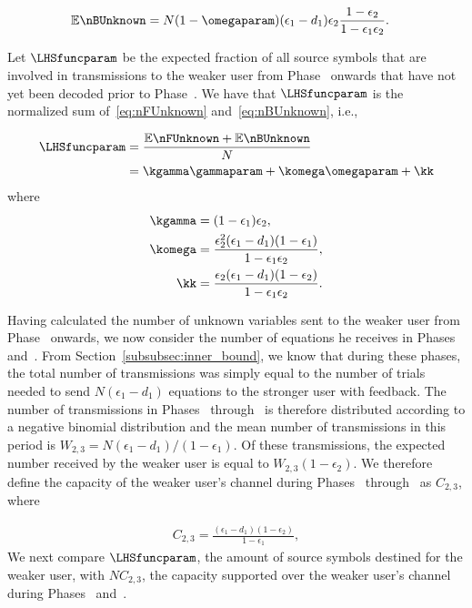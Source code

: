 \setcounter{cnt}{1}
\begin{align}
	\label{eq:nBUnknown}
	\mathbb{E}\nBUnknown &= N(1  - \omegaparam)(\epsilon_1 - d_1)\epsilon_2 \frac{1 - \epsilon_2}{1 - \epsilon_1\epsilon_2}.
\end{align}

Let $\LHSfuncparam$ be the expected fraction of all source symbols that are involved in transmissions to the weaker user from Phase~ onwards that have not yet been decoded prior to Phase~.  We have that $\LHSfuncparam$ is the normalized sum of~\eqref{eq:nFUnknown} and~\eqref{eq:nBUnknown}, i.e., 

\begin{align}
	\LHSfuncparam &= \frac{\mathbb{E}\nFUnknown + \mathbb{E}\nBUnknown}{N} \\
	&= \kgamma \gammaparam + \komega \omegaparam	+ \kk
	\label{eq:LHSfuncparam}
\end{align}
where 
\begin{subequations}
\begin{align}
	\kgamma &= (1 - \epsilon_1)\epsilon_2, \label{eq:kgamma} \\	
	\komega &= \frac{\epsilon_{2}^{2}(\epsilon_1 - d_1)(1 - \epsilon_1)}{1 - \epsilon_1\epsilon_2}, 	\label{eq:komega}\\
	\kk &= \frac{\epsilon_{2}(\epsilon_1 - d_1)(1 - \epsilon_2)}{1 - \epsilon_1\epsilon_2}.
	\label{eq:kk}
\end{align}
\end{subequations}

Having calculated the number of unknown variables sent to the weaker user from Phase~ onwards, we now consider the number of equations he receives in Phases~ and~.  From Section~\ref{subsubsec:inner_bound}, we know that during these phases, the total number of transmissions was simply equal to the number of trials needed to send $N(\epsilon_1 - d_1)$ equations to the stronger user with feedback.  The number of transmissions in Phases~ through~  is therefore distributed according to a negative binomial distribution and the mean number of transmissions in this period is $W_{2,3} = N(\epsilon_1 - d_1)/(1 -\epsilon_1)$.  Of these transmissions, the expected number received by the weaker user is equal to $W_{2, 3}(1 - \epsilon_2)$.  We therefore define the capacity of the weaker user's channel during Phases~ through~ as $C_{2,3}$, where

\begin{align}
	C_{2,3} = \frac{(\epsilon_1 - d_1)(1 - \epsilon_2)}{1 - \epsilon_1},
\end{align}
We next compare $\LHSfuncparam$, the amount of source symbols destined for the weaker user, with $NC_{2, 3}$,  the capacity supported over the weaker user's channel during Phases~ and~.  

